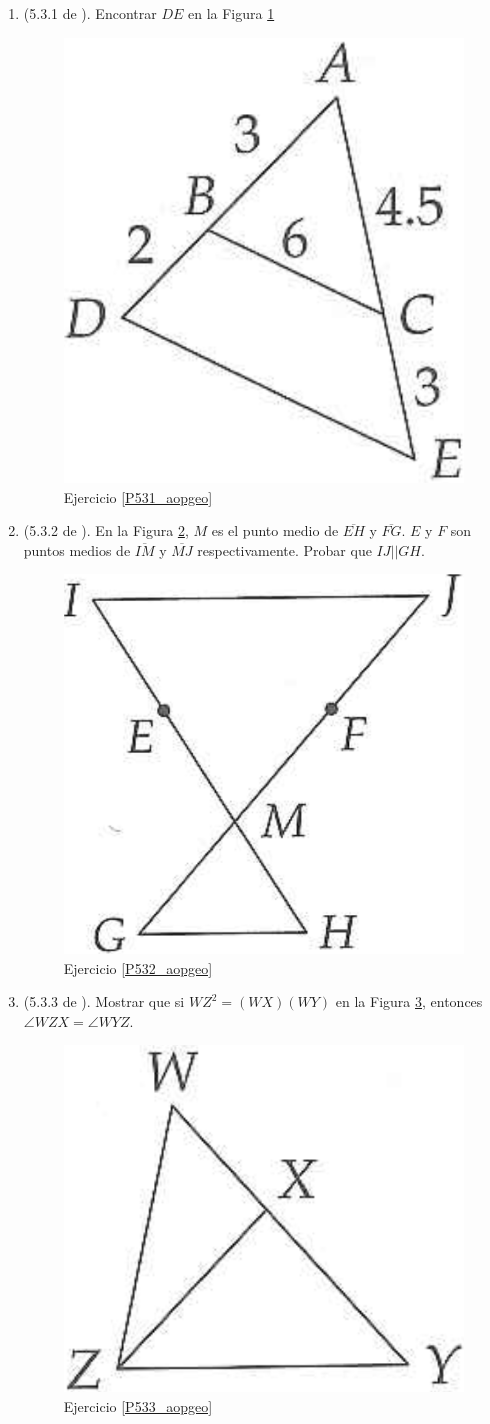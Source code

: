 \begin{enumerate}
	\item \label{P531_aopgeo} (5.3.1 de \cite{Aops_Geometria}). Encontrar $DE$ en la Figura \ref{531_aopgeo}
	
		\begin{figure}[H]
			\centering
			\includegraphics[width=0.2\linewidth]{Geometria/imgs/531_aopgeo}
			\caption{Ejercicio \ref{P531_aopgeo} }
			\label{531_aopgeo}
		\end{figure}
	
	\item \label{P532_aopgeo} (5.3.2 de \cite{Aops_Geometria}). En la Figura \ref{532_aopgeo}, $M$ es el punto medio de $\overline{EH}$ y $\overline{FG}$. $E$ y $F$ son puntos medios de $\overline{IM}$ y $\overline{MJ}$ respectivamente. Probar que $IJ||GH$.
	
	\begin{figure}[H]
		\centering
		\includegraphics[width=0.25\linewidth]{Geometria/imgs/532_aopsgeo}
		\caption{Ejercicio \ref{P532_aopgeo} }
		\label{532_aopgeo}
	\end{figure}

	\item \label{P533_aopgeo} (5.3.3 de \cite{Aops_Geometria}). Mostrar que si ${WZ}^2 = (WX)(WY)$ en la Figura \ref{533_aopgeo}, entonces $\angle WZX = \angle WYZ$.
	
	\begin{figure}[H]
		\centering
		\includegraphics[width=0.25\linewidth]{Geometria/imgs/533_aopsgeo}
		\caption{Ejercicio \ref{P533_aopgeo} }
		\label{533_aopgeo}
	\end{figure}
	

\end{enumerate}
